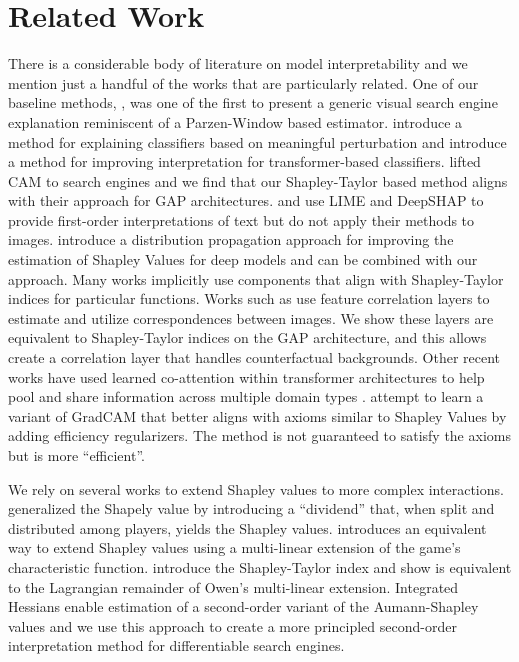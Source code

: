 \documentclass{article} %
\begin{document}
\section{Related Work}
\vspace{-.1in}
There is a considerable body of literature on model interpretability and we mention just a handful of the works that are particularly related. One of our baseline methods, \cite{sbsm}, was one of the first to present a generic visual search engine explanation reminiscent of a Parzen-Window based estimator. \cite{fong2017interpretable} introduce a method for explaining classifiers based on meaningful perturbation and \cite{chefer2021transformer} introduce a method for improving interpretation for transformer-based classifiers. \cite{vedml} lifted CAM to search engines and we find that our Shapley-Taylor based method aligns with their approach for GAP architectures. \cite{singh2019exs} and \cite{fernando2019study} use LIME and DeepSHAP to provide first-order interpretations of text but do not apply their methods to images. \cite{ancona2019explaining} introduce a distribution propagation approach for improving the estimation of Shapley Values for deep models and can be combined with our approach. Many works implicitly use components that align with Shapley-Taylor indices for particular functions. Works such as \cite{fischer2015flownet,sun2020mining,wang2020learning,MaCoSNet,hou2019cross} use feature correlation layers to estimate and utilize correspondences between images. We show these layers are equivalent to Shapley-Taylor indices on the GAP architecture, and this allows create a correlation layer that handles counterfactual backgrounds. Other recent works have used learned co-attention within transformer architectures to help pool and share information across multiple domain types \citep{wei2020multi}. \cite{fu2020axiom} attempt to learn a variant of GradCAM that better aligns with axioms similar to Shapley Values by adding efficiency regularizers. The method is not guaranteed to satisfy the axioms but is more ``efficient''. 

We rely on several works to extend Shapley values to more complex interactions. \cite{harsanyi1963simplified} generalized the Shapely value by introducing a ``dividend'' that, when split and distributed among players, yields the Shapley values. \cite{owen1972multilinear} introduces an equivalent way to extend Shapley values using a multi-linear extension of the game's characteristic function. \cite{sundararajan2020shapley} introduce the Shapley-Taylor index and show is equivalent to the Lagrangian remainder of Owen's multi-linear extension. Integrated Hessians \citep{integrated-hessians} enable estimation of a second-order variant of the Aumann-Shapley values and we use this approach to create a more principled second-order interpretation method for differentiable search engines.
\vspace{-.1in}
\end{document}

